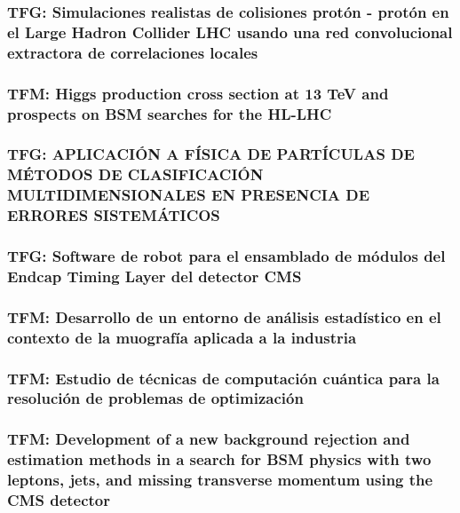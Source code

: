 \documentclass[a4paper, 11pt, twoside, openright]{report}
\begin{document}
\subsubsection{TFG: Simulaciones realistas de colisiones protón - protón en el Large Hadron Collider LHC usando una red convolucional extractora de correlaciones locales}


\subsubsection{TFM: Higgs production cross section at 13 TeV and prospects on BSM searches for the HL-LHC}


\subsubsection{TFG: APLICACIÓN A FÍSICA DE PARTÍCULAS DE MÉTODOS DE CLASIFICACIÓN MULTIDIMENSIONALES EN PRESENCIA DE ERRORES SISTEMÁTICOS}


\subsubsection{TFG: Software de robot para el ensamblado de módulos del Endcap Timing Layer del detector CMS}


\subsubsection{TFM: Desarrollo de un entorno de análisis estadístico en el contexto de la muografía aplicada a la industria}


\subsubsection{TFM: Estudio de técnicas de computación cuántica para la resolución de problemas de optimización}


\subsubsection{TFM: Development of a new background rejection and estimation methods in a search for BSM physics with two leptons, jets, and missing transverse momentum using the CMS detector}

\end{document}
